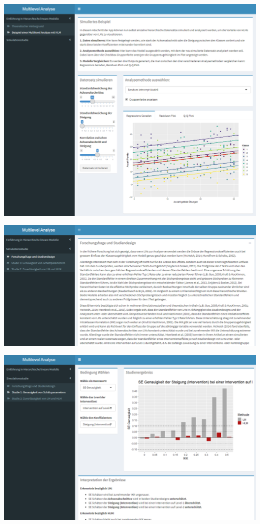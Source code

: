 \documentclass[12pt]{article}\usepackage[]{graphicx}\usepackage[]{color}
\begin{document}
\begin{center}
\includegraphics[scale=0.5]{./figures/app_beispiel}
\end{center}

\begin{center}
\includegraphics[scale=0.5]{./figures/app_forschungsfrage}
\end{center}

\begin{center}
\includegraphics[scale=0.5]{./figures/app_study1}
\end{center}
\end{document}
